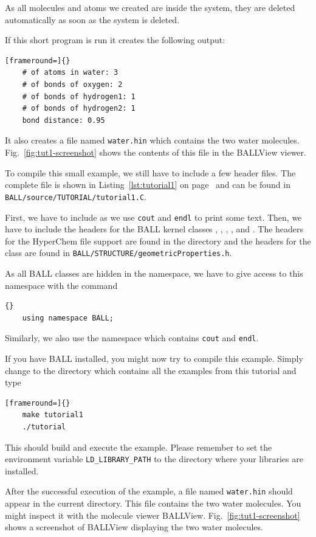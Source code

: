 \noindent 
As all molecules and atoms we created are inside the system, they are deleted
automatically as soon as the system is deleted.

If this short program is run it creates the following output:

\begin{lstlisting}[frameround=]{}
	# of atoms in water: 3
	# of bonds of oxygen: 2
	# of bonds of hydrogen1: 1
	# of bonds of hydrogen2: 1
	bond distance: 0.95
\end{lstlisting}

\noindent
It also creates a file named {\tt water.hin} which contains the two water
molecules. Fig.~\ref{fig:tut1-screenshot} shows the contents of this file
in the BALLView viewer.

To compile this small example, we still have to include a few header files.
The complete file is shown in Listing~\ref{lst:tutorial1} on
page~\pageref{lst:tutorial1} and can be found in \mbox{{\tt
BALL/source/TUTORIAL/tutorial1.C}}.

First, we have to include  as we use {\tt cout} and {\tt endl}
to print some text. Then, we have to include the headers for the BALL kernel
classes , , , , and
. The headers for the HyperChem file support are found in the
directory  and the headers for the
 class are found in
{\tt BALL/STRUCTURE/geometricProperties.h}.

As all BALL classes are hidden in the  namespace, we have to
give access to this namespace with the command 
\begin{lstlisting}{}
	using namespace BALL;
\end{lstlisting}
Similarly, we also use the namespace  which contains {\tt cout}
and {\tt endl}.

If you have BALL installed, you might now try to compile this example. Simply
change to the directory  which contains all
the examples from this tutorial and type 
\begin{lstlisting}[frameround=]{}
	make tutorial1
	./tutorial
\end{lstlisting}
This should build and execute the example. Please remember to set the
environment variable {\tt LD\_LIBRARY\_PATH} to the directory where your
libraries are installed.

After the successful execution of the example, a file named {\tt water.hin}
should appear in the current directory. This file contains the two water
molecules. You might inspect it with the molecule viewer BALLView.
Fig.~\ref{fig:tut1-screenshot} shows a screenshot of BALLView displaying the two
water molecules.

